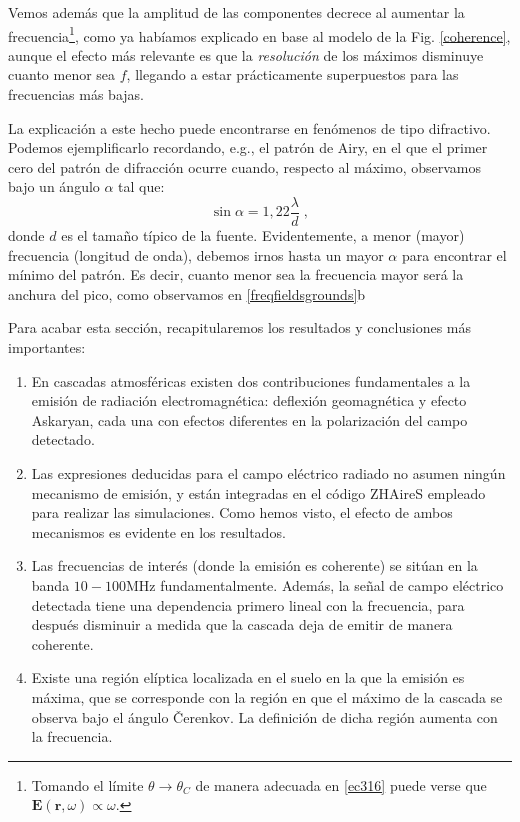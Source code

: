 \documentclass[11 pt, a4paper]{article} %
\numberwithin{equation}{section}
\numberwithin{figure}{section}
\numberwithin{table}{section}
\newcommand{\vect}[1]{\boldsymbol{\mathbf{#1}}}
\begin{document}
Vemos además que la amplitud de las componentes decrece al aumentar la frecuencia\footnote{ Tomando el límite $\theta\rightarrow\theta_C$ de manera adecuada en \eqref{ec316} puede verse que $\vect{E}\left(\vect{r},\omega\right)\propto\omega$.}, como ya habíamos explicado en base al modelo de la Fig. \ref{coherence}, aunque el efecto más relevante es que la \textit{resolución} de los máximos disminuye cuanto menor sea $f$, llegando a estar prácticamente superpuestos para las frecuencias más bajas. 

La explicación a este hecho puede encontrarse en fenómenos de tipo difractivo. Podemos ejemplificarlo recordando, e.g., el patrón de Airy, en el que el primer cero del patrón de difracción ocurre cuando, respecto al máximo, observamos bajo un ángulo $\alpha$ tal que:
\begin{equation}
	\sin\alpha=1,22\frac{\lambda}{d}\;,\label{ec318}
\end{equation}  
donde $d$ es el tamaño típico de la fuente. Evidentemente, a menor (mayor) frecuencia (longitud de onda), debemos irnos hasta un mayor $\alpha$ para encontrar el mínimo del patrón. Es decir, cuanto menor sea la frecuencia mayor será la anchura del pico, como observamos en \ref{freqfieldsgrounds}b

Para acabar esta sección, recapitularemos los resultados y conclusiones más importantes:
\begin{enumerate}
	\item En cascadas atmosféricas existen dos contribuciones fundamentales a la emisión de radiación electromagnética: deflexión geomagnética y efecto Askaryan, cada una con efectos diferentes en la polarización del campo detectado.
	\item Las expresiones deducidas para el campo eléctrico radiado no asumen ningún mecanismo de emisión, y están integradas en el código ZHAireS empleado para realizar las simulaciones. Como hemos visto, el efecto de ambos mecanismos es evidente en los resultados.
	\item Las frecuencias de interés (donde la emisión es coherente) se sitúan en la banda $10-100\mathrm{MHz}$ fundamentalmente. Además, la señal de campo eléctrico detectada tiene una dependencia primero lineal con la frecuencia, para después disminuir a medida que la cascada deja de emitir de manera coherente. 
	\item Existe una región elíptica localizada en el suelo en la que la emisión es máxima, que se corresponde con la región en que el máximo de la cascada se observa bajo el ángulo \v{C}erenkov. La definición de dicha región aumenta con la frecuencia.
\end{enumerate}
\clearpage
\end{document}
